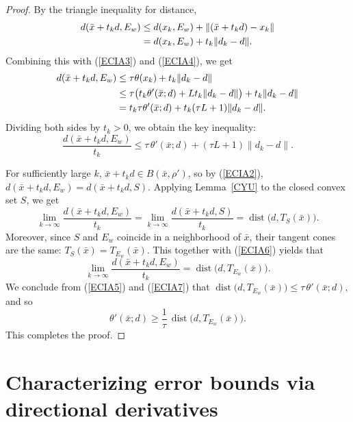 \documentclass[11pt]{article}
\begin{document}
\begin{proof}
 
	By the triangle inequality for distance,
	\begin{align*}
		d(\bar x+t_k d, E_w) &\le d(x_k, E_w) + \|(\bar x+t_k d)-x_k\| \notag\\
		&= d(x_k, E_w) + t_k\|d_k-d\|.  
	\end{align*}
 Combining this with   (\ref{ECIA3})   and   (\ref{ECIA4}), we get
	\begin{align*}
		d(\bar x+t_k d, E_w)
		&\le \tau\theta(x_k) + t_k\|d_k-d\| \notag\\
		&\le \tau\bigl( t_k\theta'(\bar x;d) + L t_k\|d_k-d\|\bigr) + t_k\|d_k-d\| \notag\\
		&= t_k \tau \theta'(\bar x;d) + t_k(\tau L+1)\|d_k-d\|.
	\end{align*}
	Dividing both sides by $t_k>0$, we obtain the key inequality:
	\begin{equation}\label{ECIA5}
		\frac{d(\bar x+t_k d, E_w)}{t_k} \le \tau\,\theta'(\bar x;d) + (\tau L+1)\|d_k-d\|.  
	\end{equation}
	
 
	For sufficiently large $k$, $\bar x+t_k d\in B(\bar x,\rho')$, so by  (\ref{ECIA2}), $d(\bar x+t_k d, E_w) = d(\bar x+t_k d, S)$. Applying Lemma~\ref{CYU} to the closed convex set $S$, we get
	\begin{equation}\label{ECIA6}
	\lim_{k\to\infty}\frac{d(\bar x+t_k d, E_w)}{t_k} = \lim_{k\to\infty}\frac{d(\bar x+t_k d, S)}{t_k} = \operatorname{dist}\bigl(d, T_S(\bar x)\bigr).
	\end{equation}
	Moreover, since $S$ and $E_w$ coincide in a neighborhood of $\bar x$, their tangent cones are the same: $T_S(\bar x) = T_{E_w}(\bar x)$.  This together with  (\ref{ECIA6})  yields that 
	\begin{equation}\label{ECIA7}
		\lim_{k\to\infty}\frac{d(\bar x+t_k d, E_w)}{t_k} =   \operatorname{dist}\bigl(d, T_{E_w}(\bar x)\bigr).
	\end{equation}
	    We conclude from  (\ref{ECIA5})  and  (\ref{ECIA7})  that
$	\operatorname{dist}\bigl(d, T_{E_w}(\bar x)\bigr) \le \tau\,\theta'(\bar x;d),$
and so
	\[
	\theta'(\bar x;d) \ge \frac{1}{\tau}\,\operatorname{dist}\bigl(d, T_{E_w}(\bar x)\bigr).
	\]
	This completes the proof.
\end{proof}

\section{Characterizing error bounds via directional derivatives}
 
\end{document}
